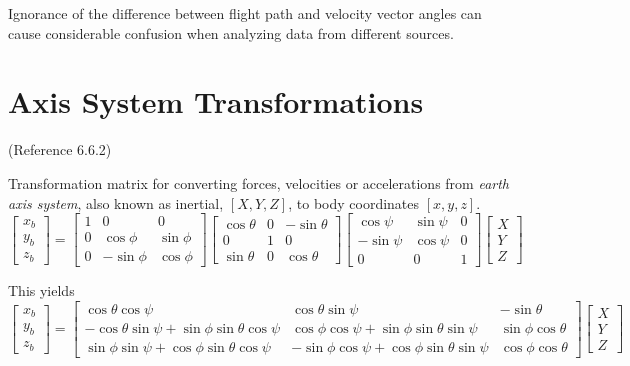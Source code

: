 \documentclass[
]{book}
\begin{document}
Ignorance of the difference between flight path and velocity vector angles can cause considerable confusion when analyzing data from different sources.

\hypertarget{axis-system-transformations}{%
\section{Axis System Transformations}\label{axis-system-transformations}}

(Reference 6.6.2)

Transformation matrix for converting forces, velocities or accelerations from \emph{earth axis system}, also known as inertial, \([X, Y, Z]\), to body coordinates \([x, y, z]\).
\[
\begin{bmatrix}
x_b \\
y_b \\
z_b
\end{bmatrix} = 
\begin{bmatrix}
1 & 0 & 0 \\
0 & \cos\phi & \sin\phi \\
0 & -\sin\phi & \cos\phi
\end{bmatrix}
\begin{bmatrix}
\cos\theta & 0 & -\sin\theta \\
0 & 1 & 0 \\
\sin\theta & 0 & \cos\theta
\end{bmatrix}
\begin{bmatrix}
\cos\psi & \sin\psi & 0 \\
-\sin\psi & \cos\psi & 0 \\
0 & 0 & 1
\end{bmatrix}
\begin{bmatrix}
X \\
Y \\
Z 
\end{bmatrix}
\]

This yields
\[
\begin{bmatrix}
x_b \\
y_b \\
z_b
\end{bmatrix} = 
\begin{bmatrix}
\cos\theta \cos\psi & \cos\theta \sin\psi & -\sin\theta \\
-\cos\theta \sin\psi + \sin\phi \sin\theta \cos\psi & \cos\phi \cos\psi + \sin\phi \sin\theta \sin\psi  & \sin\phi \cos\theta \\
\sin\phi \sin\psi + \cos\phi \sin\theta \cos\psi & -\sin\phi \cos\psi + \cos\phi \sin\theta \sin\psi & \cos\phi \cos\theta
\end{bmatrix}
\begin{bmatrix}
X \\
Y \\
Z 
\end{bmatrix}
\]
\end{document}
